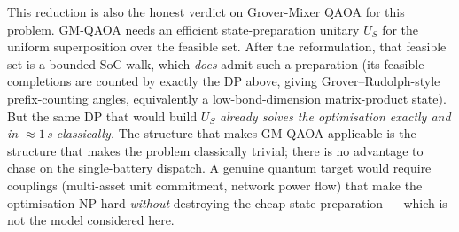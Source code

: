 \documentclass[11pt]{article}
\begin{document}
This reduction is also the honest verdict on Grover-Mixer QAOA for this problem.
GM-QAOA needs an efficient state-preparation unitary $U_S$ for the uniform
superposition over the feasible set. After the reformulation, that feasible set
is a bounded SoC walk, which \emph{does} admit such a preparation (its feasible
completions are counted by exactly the DP above, giving Grover--Rudolph-style
prefix-counting angles, equivalently a low-bond-dimension matrix-product state).
But the same DP that would build $U_S$ \emph{already solves the optimisation
exactly and in $\approx 1$\,s classically.} The structure that makes GM-QAOA
applicable is the structure that makes the problem classically trivial; there is
no advantage to chase on the single-battery dispatch. A genuine quantum target
would require couplings (multi-asset unit commitment, network power flow) that
make the optimisation NP-hard \emph{without} destroying the cheap state
preparation --- which is not the model considered here.
\end{document}
